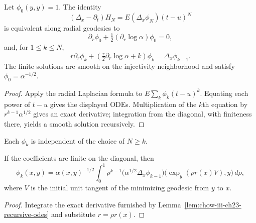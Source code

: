 \begin{lemma}
\label{lem:chow-iii-ch23-recursive-odes}


Let $\phi_0(y,y)=1$.  The identity
\[
(\Delta_x-\partial_t)H_N=E(\Delta_x\phi_N)(t-u)^N
\]
is equivalent along radial geodesics to
\[
\partial_r\phi_0+\tfrac12(\partial_r\log\alpha)\phi_0=0,
\]
and, for $1\le k\le N$,
\[
r\partial_r\phi_k+\left(\tfrac r2\partial_r\log\alpha+k\right)\phi_k
=\Delta_x\phi_{k-1}.
\]
The finite solutions are smooth on the injectivity neighborhood and satisfy
\(\phi_0=\alpha^{-1/2}\).
\end{lemma}
\begin{proof}
\sketch Apply the radial Laplacian formula to $E\sum_k\phi_k(t-u)^k$.  Equating each
power of $t-u$ gives the displayed ODEs.  Multiplication of the $k$th equation
by $r^{k-1}\alpha^{1/2}$ gives an exact derivative; integration from the
diagonal, with finiteness there, yields a smooth solution recursively.
\end{proof}

\begin{remark}[Independence of $N$]
\label{rem:chow-iii-ch23-coefficients-independent}

Each $\phi_k$ is independent of the choice of $N\ge k$.
\end{remark}

\begin{lemma}
\label{lem:chow-iii-ch23-recursive-formula}


If the coefficients are finite on the diagonal, then
\[
\phi_k(x,y)=\alpha(x,y)^{-1/2}\int_0^1\rho^{k-1}
 \bigl(\alpha^{1/2}\Delta_x\phi_{k-1}\bigr)
 \bigl(\exp_y(\rho r(x)V),y\bigr)\,d\rho,
\]
where $V$ is the initial unit tangent of the minimizing geodesic from $y$ to
$x$.
\end{lemma}
\begin{proof}
\sketch Integrate the exact derivative furnished by
Lemma~\ref{lem:chow-iii-ch23-recursive-odes} and substitute
$r=\rho r(x)$.
\end{proof}

